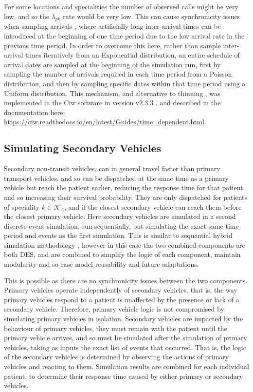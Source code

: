 \documentclass[numbers,webpdf,imaman]{ima-authoring-template}%
\begin{document}
For some locations and specialities the number of observed calls might be very
low, and so the $\lambda_{pk}$ rate would be very low. This can cause
synchronicity issues when sampling arrivals \citep{pidd2004computer}, where
artificially long inter-arrival times can be introduced at the beginning of
one time period due to the low arrival rate in the previous time period.
In order to overcome this here, rather than sample inter-arrival times
iteratively from an Exponential distribution, an entire schedule of arrival
dates are sampled at the beginning of the simulation run, first by sampling
the number of arrivals required in each time period from a Poisson
distribution, and then by sampling specific dates within that time period
using a Uniform distribution.
This mechanism, and alternative to thinning \citep{lewisshedler79}, was
implemented in the Ciw software in version v2.3.3 \citep{ciw233}, and described
in the documentation here:
\url{https://ciw.readthedocs.io/en/latest/Guides/time_dependent.html}.


\subsection{Simulating Secondary Vehicles}\label{sec:simulation_secondary}
Secondary non-transit vehicles, can in general travel faster than primary
transport vehicles, and so can be dispatched at the same time as a primary
vehicle but reach the patient earlier, reducing the response time for that
patient and so increasing their survival probability. They are only dispatched
for patients of speciality $k \in \mathcal{K}_A$, and if the closest secondary
vehicle can reach them before the closest primary vehicle.
Here secondary vehicles are simulated in a second discrete event simulation,
run sequentially, but simulating the exact same time period and events as the
first simulation. This is similar to sequential hybrid simulation methodology
\citep{brailsfordetal19, morganetal17}, however in this case the two combined
components are both DES, and are combined to simplify the logic of each
component, maintain modularity and so ease model reusability and future
adaptations.

This is possible as there are no synchronicity issues between the two
components. Primary vehicles operate independently of secondary vehicles, that
is, the way primary vehicles respond to a patient is unaffected by the presence
or lack of a secondary vehicle.
Therefore, primary vehicle logic is not compromised by simulating primary
vehicles in isolation.
Secondary vehicles are impacted by the behaviour of primary vehicles, they
must remain with the patient until the primary vehicle arrives, and so must be
simulated after the simulation of primary vehicles, taking as inputs the exact
list of events that occurred. That is, the logic of the secondary vehicles is
determined by observing the actions of primary vehicles and reacting to them.
Simulation results are combined for each individual patient, to determine
their response time caused by either primary or secondary vehicles.
\end{document}
